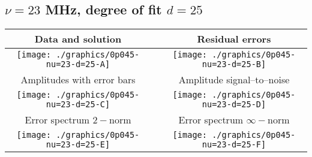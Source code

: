 

% 

\clearpage{}
\break{}

\subsection{$\nu = 23$ MHz, degree of fit $d = 25$}

\begin{table}[h]
    \begin{center}
        \begin{tabular}{ccc}
            Data and solution & \quad & Residual errors \\\hline
            \texttt{[image: ./graphics/0p045-nu=23-d=25-A]} &&
            \texttt{[image: ./graphics/0p045-nu=23-d=25-B]} \\[15pt]
            Amplitudes with error bars && Amplitude signal--to--noise \\\hline
            \texttt{[image: ./graphics/0p045-nu=23-d=25-C]} &&
            \texttt{[image: ./graphics/0p045-nu=23-d=25-D]} \\[15pt]
            Error spectrum $2-$norm && Error spectrum $\infty-$norm \\\hline
            \texttt{[image: ./graphics/0p045-nu=23-d=25-E]} &&
            \texttt{[image: ./graphics/0p045-nu=23-d=25-F]} \\[15pt]
        \end{tabular}
    \end{center}
\label{fig:elev=45, nu=23}
\end{table}



\endinput

